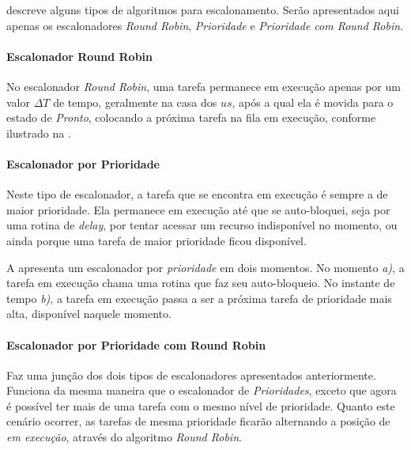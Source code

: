  descreve alguns tipos de algoritmos para escalonamento. Serão apresentados aqui apenas os escalonadores \emph{Round Robin}, \emph{Prioridade} e \emph{Prioridade com Round Robin}.

\paragraph{Escalonador Round Robin}

No escalonador \emph{Round Robin}, uma tarefa permanece em execução apenas por um valor $\Delta T$ de tempo, geralmente na casa dos $us$, após a qual ela é movida para o estado de \emph{Pronto}, colocando a próxima tarefa na fila em execução, conforme ilustrado na .


\paragraph{Escalonador por Prioridade}

Neste tipo de escalonador, a tarefa que se encontra em execução é sempre a de maior prioridade. Ela permanece em execução até que se auto-bloquei, seja por uma rotina de \emph{delay}, por tentar acessar um recurso indisponível no momento, ou ainda porque uma tarefa de maior prioridade ficou disponível.

A  apresenta um escalonador por \emph{prioridade} em dois momentos. No momento \emph{a)}, a tarefa em execução chama uma rotina que faz seu auto-bloqueio. No instante de tempo \emph{b)}, a tarefa em execução passa a ser a próxima tarefa de prioridade mais alta, disponível naquele momento.


\paragraph{Escalonador por Prioridade com Round Robin}

Faz uma junção dos dois tipos de escalonadores apresentados anteriormente. Funciona da mesma maneira que o escalonador de \emph{Prioridades}, exceto que agora é possível ter mais de uma tarefa com o mesmo nível de prioridade. Quanto este cenário ocorrer, as tarefas de mesma prioridade ficarão alternando a posição de \emph{em execução}, através do algoritmo \emph{Round Robin}.

